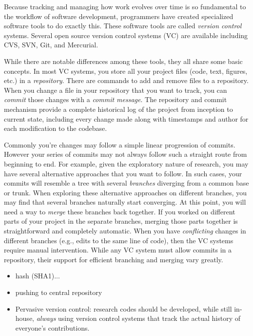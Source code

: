 \documentclass[ChapterTOCs,krantz2]{krantz} %
\begin{document}
Because tracking and managing how work evolves over time is so fundamental to the
workflow of software development, programmers have created specialized software
tools to do exactly this. These software tools are called \emph{version
control} systems. Several open source version control systems (VC) are
available including CVS, SVN, Git, and Mercurial.

While there are notable differences among these tools, they all share some
basic concepts.  In most VC systems, you store all your project files (code,
text, figures, etc.) in a \emph{repository}.  There are commands to add and
remove files to a repository.  When you change a file in your repository that
you want to track, you can \emph{commit} those changes with a \emph{commit
message}.  The repository and commit mechanism provide a complete historical
log of the project from inception to current state, including every change made
along with timestamps and author for each modification to the codebase.

Commonly you're changes may follow a simple linear progression of commits.
However your series of commits may not always follow such a straight route from
beginning to end. For example, given the exploratory nature of research, you
may have several alternative approaches that you want to follow. In such cases,
your commits will resemble a tree with several \emph{branches} diverging from a
common base or trunk. When exploring these alternative approaches on different
branches, you may find that several branches naturally start converging. At
this point, you will need a way to \emph{merge} these branches back together.
If you worked on different parts of your project in the separate branches,
merging those parts together is straightforward and completely automatic. When
you have \emph{conflicting} changes in different branches (e.g., edits to the
same line of code), then the VC systems require manual intervention. While any
VC system must allow commits in a repository, their support for efficient
branching and merging vary greatly.

\begin{itemize}

\item hash (SHA1)... 

\item pushing to central repository


\item Pervasive version control: research codes should be developed, while
still in-house, \emph{always} using version control systems that track
the actual history of everyone's contributions.

\end{itemize}
\end{document}
